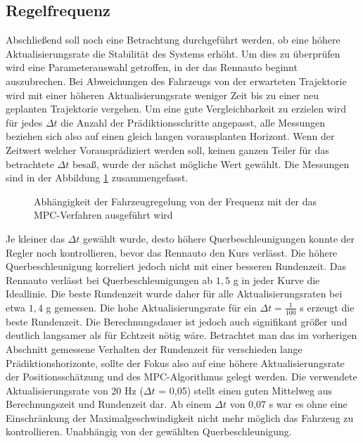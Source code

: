 \documentclass{like}
\begin{document}
\subsection{Regelfrequenz}
Abschließend soll noch eine Betrachtung durchgeführt werden, ob eine höhere Ak\-tu\-a\-li\-sie\-rungs\-ra\-te die Stabilität des Systems erhöht. Um dies zu überprüfen wird eine Parameter\-aus\-wahl getroffen, in der das Rennauto beginnt auszubrechen. Bei Abweichungen des Fahrzeugs von der erwarteten Trajektorie wird mit einer höheren Ak\-tu\-a\-li\-sie\-rungs\-ra\-te weniger Zeit bis zu einer neu geplanten Trajektorie vergehen. Um eine gute Vergleichbarkeit zu erzielen wird für jedes $\Delta t$ die Anzahl der Prädiktionsschritte angepasst, alle Messungen beziehen sich also auf einen gleich langen vorausplanten Horizont. Wenn der Zeitwert welcher Vorausprädiziert werden soll, keinen ganzen Teiler für das betrachtete $\Delta t$ besaß, wurde der nächst mögliche Wert gewählt. Die Messungen sind in der Abbildung \ref{fig:measureUpdateRate} zusammengefasst. 
\begin{figure}[ht!]
	\centering
	\caption{Abhängigkeit der Fahrzeugregelung von der Frequenz mit der das \ac{MPC}-Verfahren ausgeführt wird }\label{fig:measureUpdateRate}
\end{figure}
Je kleiner das $\Delta t$ gewählt wurde, desto höhere Querbeschleunigungen konnte der Regler noch kontrollieren, bevor das Rennauto den Kurs verlässt. Die höhere Querbeschleunigung korreliert jedoch nicht mit einer besseren Rundenzeit. Das Rennauto verlässt bei Querbeschleunigungen ab $1,5$ g in jeder Kurve die Ideallinie. Die beste Rundenzeit wurde daher für alle Aktualisierungsraten bei etwa $1,4$ g gemessen. 
Die hohe Ak\-tu\-a\-li\-sie\-rungs\-ra\-te für ein $\Delta t = \frac{1}{100}$ s erzeugt die beste Rundenzeit. Die Berechnungsdauer ist jedoch auch signifikant größer und deutlich langsamer als für Echtzeit nötig wäre. Betrachtet man das im vorherigen Abschnitt gemessene Verhalten der Rundenzeit für verschieden lange Prädiktionshorizonte, sollte der Fokus also auf eine höhere Ak\-tu\-a\-li\-sie\-rungs\-ra\-te der Positionsschätzung und des \ac{MPC}-Algorithmus gelegt werden. Die verwendete Ak\-tu\-a\-li\-sie\-rungs\-ra\-te von 20 Hz ($\Delta t$ = 0,05) stellt einen guten Mittelweg aus Berechnungszeit und Rundenzeit dar. Ab einem $\Delta t$ von 0,07 s war es ohne eine Einschränkung der Maximalgeschwindigkeit nicht mehr möglich das Fahrzeug zu kon\-t\-rol\-lie\-ren. Unabhängig von der gewählten Quer\-be\-schleu\-ni\-gung. 
\end{document}

